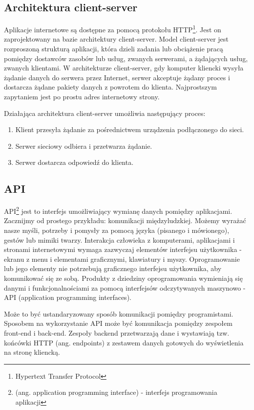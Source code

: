 \subsection{Architektura client-server}
Aplikacje internetowe są dostępne za pomocą protokołu HTTP\footnote{Hypertext Transfer Protocol}. Jest on zaprojektowany na bazie architektury client-server. Model client-server jest rozproszoną strukturą aplikacji, która dzieli zadania lub obciążenie pracą pomiędzy dostawców zasobów lub usług, zwanych serwerami, a żądających usług, zwanych klientami. W architekturze client-server, gdy komputer kliencki wysyła żądanie danych do serwera przez Internet, serwer akceptuje żądany proces i dostarcza żądane pakiety danych z powrotem do klienta. Najprostszym zapytaniem jest po prostu adres internetowy strony.

Działająca architektura client-server umożliwia następujący proces:

\begin{enumerate}
    \item Klient przesyła żądanie za pośrednictwem urządzenia podłączonego do sieci.
    \item Serwer sieciowy odbiera i przetwarza żądanie.
    \item Serwer dostarcza odpowiedź do klienta.
\end{enumerate}

\subsection{API}
API\footnote{(ang. application programming interface) - interfejs programowania aplikacji} jest to interfejs umożliwiający wymianę danych pomiędzy aplikacjami.
Zacznijmy od prostego przykładu: komunikacji międzyludzkiej. Możemy wyrażać nasze myśli, potrzeby i pomysły za pomocą języka (pisanego i mówionego), gestów lub mimiki twarzy. Interakcja człowieka z komputerami, aplikacjami i stronami internetowymi wymaga zazwyczaj elementów interfejsu użytkownika - ekranu z menu i elementami graficznymi, klawiatury i myszy. Oprogramowanie lub jego elementy nie potrzebują graficznego interfejsu użytkownika, aby komunikować się ze sobą. Produkty z dziedziny oprogramowania wymieniają się danymi i funkcjonalnościami za pomocą interfejsów odczytywanych maszynowo - API (application programming interfaces).


Może to być ustandaryzowany sposób komunikacji pomiędzy programistami. Sposobem na wykorzystanie API może być komunikacja pomiędzy zespołem front-end i back-end. Zespoły backend przetwarzają dane i wystawiają tzw. końcówki HTTP (ang. endpoints) z zestawem danych gotowych do wyświetlenia na stronę kliencką.

